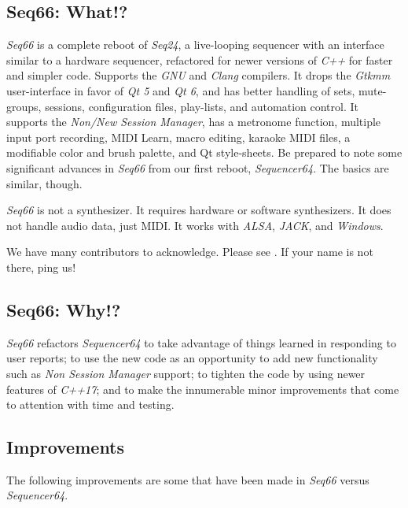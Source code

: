 \documentclass[
 11pt,
 twoside,
 a4paper,
 final                                 %
]{article}
\begin{document}
\subsection{Seq66: What!?}
\label{subsec:what_is_seq66}

   \textsl{Seq66} is
   a complete reboot of \textsl{Seq24},
   a live-looping sequencer with an interface similar to a hardware sequencer,
   refactored for newer versions of
   \textsl{C++} for faster and simpler code.
   Supports the \textsl{GNU} and \textsl{Clang} compilers.
   It drops the
   \textsl{Gtkmm} user-interface in favor of \textsl{Qt 5}
   and \textsl{Qt 6},
   and has better handling of sets, mute-groups, sessions, configuration files,
   play-lists, and automation control.
   It supports the \textsl{Non/New Session Manager},
   has a metronome function,
   multiple input port recording,
   MIDI Learn, macro editing, karaoke MIDI files,
   a modifiable color and brush palette,
   and Qt style-sheets.
   Be prepared to note some significant advances
   in  \textsl{Seq66} from our first reboot, \textsl{Sequencer64}.
   The basics are similar, though.

   \textsl{Seq66} is not a synthesizer.
   It requires hardware or software synthesizers.
   It does not handle audio data, just MIDI.
   It works with \textsl{ALSA}, \textsl{JACK},
   and \textsl{Windows}.

   We have many contributors to acknowledge.
   Please see .
   If your name is not there, ping us!

\subsection{Seq66: Why!?}
\label{subsec:introduction_vs_others}

   \textsl{Seq66} refactors \textsl{Sequencer64} to take advantage of
   things learned in responding to user reports;  to use
   the new code as an opportunity to add new functionality such as
   \textsl{Non Session Manager} support; to tighten the
   code by using newer features of \textsl{C++17};
   and to make the innumerable minor improvements that come to
   attention with time and testing.

\subsection{Improvements}
\label{subsec:improvements}

   The following improvements are some that have been made in
   \textsl{Seq66} versus \textsl{Sequencer64}.
\end{document}
